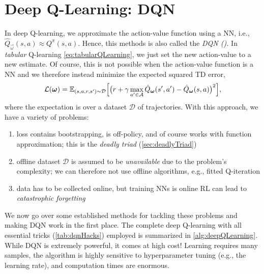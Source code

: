 	\section{Deep Q-Learning: \acs{DQN}}
		In deep Q-learning, we approximate the action-value function using a \ac{NN}, i.e., \( \hat{Q}_{\vec{\omega}}(s, a) \approx Q^\pi(s, a) \). Hence, this methods is also called the \emph{\acl{DQN} ().} In \emph{tabular} Q-learning \eqref{eq:tabularQLearning}, we just set the new action-value to a new estimate. Of course, this is not possible when the action-value function is a \ac{NN} and we therefore instead minimize the expected squared \ac{TD} error,
		\begin{equation}
			\mathcal{L}(\bm{\omega}) = \mathbb{E}_{(s, a, r, s') \sim \mathcal{D}}\Bigl[ \bigl( r + \gamma \max_{a' \in \mathcal{A}} \hat{Q}_{\bm{\omega}}(s', a') - \hat{Q}_{\bm{\omega}}(s, a) \bigr)^2 \Bigr],
		\end{equation}
		where the expectation is over a dataset \(\mathcal{D}\) of trajectories. With this approach, we have a variety of problems:
		\begin{enumerate}
			\item loss contains bootstrapping, is off-policy, and of course works with function approximation; this is the \emph{deadly triad} (\autoref{sec:deadlyTriad})
			\item offline dataset \(\mathcal{D}\) is assumed to be \emph{unavailable} due to the problem's complexity; we can therefore not use offline algorithms, e.g., fitted Q-iteration
			\item data has to be collected online, but training \acp{NN} is online \ac{RL} can lead to \emph{catastrophic forgetting}
		\end{enumerate}
		We now go over some established methods for tackling these problems and making \ac{DQN} work in the first place. The complete deep Q-learning with all essential tricks (\autoref{tab:dqnHacks}) employed is summarized in \autoref{alg:deepQLearning}. While \ac{DQN} is extremely powerful, it comes at high cost! Learning requires many samples, the algorithm is highly sensitive to hyperparameter tuning (e.g., the learning rate), and computation times are enormous.


